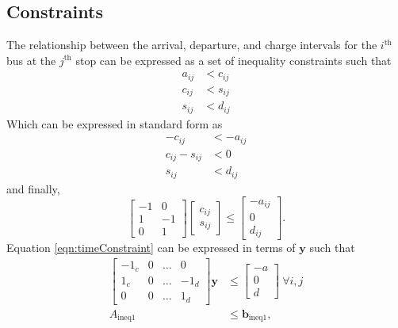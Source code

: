 \subsection{Constraints}
The relationship between the arrival, departure, and charge intervals for the $i^{\text{th}}$ bus at the $j^{\text{th}}$ stop can be expressed as a set of inequality constraints such that
\begin{equation}\begin{aligned}
	a_{ij} &< c_{ij} \\
	c_{ij} &< s_{ij} \\
	s_{ij} &< d_{ij}
\end{aligned}\end{equation}
Which can be expressed in standard form as
\begin{equation}\begin{aligned}
	-c_{ij} &< -a_{ij}\\
	c_{ij} - s_{ij} &< 0\\
	s_{ij} &< d_{ij}
\end{aligned}\end{equation}
and finally, 
\begin{equation}\label{eqn:timeConstraint}
	\begin{bmatrix} -1 & 0 \\
	                 1 & -1 \\
		0 & 1\end{bmatrix} \begin{bmatrix} c_{ij} \\ s_{ij}\end{bmatrix} \le \begin{bmatrix}-a_{ij} \\ 0 \\ d_{ij} \end{bmatrix}.
\end{equation}
	Equation \ref{eqn:timeConstraint} can be expressed in terms of $\mathbf{y}$ such that
\begin{equation} \begin{aligned}
	\begin{bmatrix}-1_c & 0 & \hdots & 0    \\
                        1_c & 0 & \hdots & -1_d \\
		0   & 0 & \hdots & 1_d \end{bmatrix}\mathbf{y} &\le \begin{bmatrix} -a \\ 0 \\ d\end{bmatrix} \ \forall i,j \\
			A_{\text{ineq1}} &\le \mathbf{b}_{\text{ineq1}},
\end{aligned} \end{equation}
